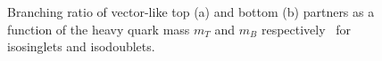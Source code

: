 \begin{figure}
\centering
\caption{Branching ratio of vector-like top (a) and bottom (b) partners as a function of the heavy quark mass $m_T$ and $m_B$ respectively~\cite{ATLAS-CONF-2013-056} for isosinglets and isodoublets.}
\label{fig:vlqbrs}
\end{figure}

